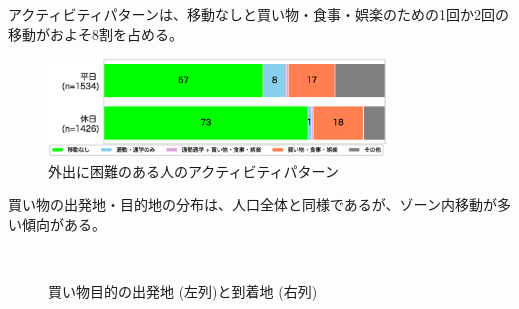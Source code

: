 \documentclass[a4paper,12pt, uplatex]{jsbook}
\begin{document}
アクティビティパターンは、移動なしと買い物・食事・娯楽のための1回か2回の移動がおよそ8割を占める。
%
\begin{figure}[htbp]
    \centering
    \includegraphics[width=0.8\textwidth]{picture/activity_pattern_介助.eps}
    \caption{外出に困難のある人のアクティビティパターン}
    \label{fig:activity_pattern_care}
\end{figure}


買い物の出発地・目的地の分布は、人口全体と同様であるが、ゾーン内移動が多い傾向がある。
%
\begin{figure}[htbp]
  \centering
  \\%
    \caption{買い物目的の出発地 (左列)と到着地 (右列)}
  	\label{fig:od_shopping_care}
\end{figure}
\end{document}
